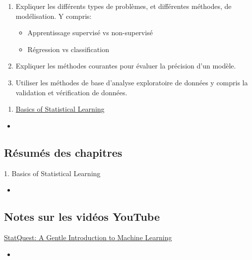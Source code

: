 \documentclass[12pt, titlepage, french]{report}
\begin{document}
\begin{outcomes}
\begin{enumerate}
	\item	Expliquer les différents types de problèmes, et différentes méthodes, de modélisation. Y compris: 
	\begin{itemize}
		\item	Apprentissage supervisé vs non-supervisé
		\item	Régression vs classification	
	\end{itemize}
	\item	Expliquer les méthodes courantes pour évaluer la précision d'un modèle.
	\item	Utiliser les méthodes de base d'analyse exploratoire de données y compris la validation et vérification de données.
\end{enumerate}
\end{outcomes}

\begin{ASM_chapter}
\begin{enumerate}
	\item	\hyperref[BASICS]{Basics of Statistical Learning}
\end{enumerate}
\end{ASM_chapter}

\begin{YTB_vids}
\begin{itemize}
	\item	
\end{itemize}
\end{YTB_vids}

\subsection{Résumés des chapitres}

\begin{CHPT_SUMM}[label = {BASICS}]{1. Basics of Statistical Learning}
	\begin{itemize}
		\item	
	\end{itemize}
\end{CHPT_SUMM}

\subsection{Notes sur les vidéos YouTube}

\begin{YTB_SUMM}[label = {SQ-BASICS-ML-INTRO}]{\href{https://www.youtube.com/watch?v=Gv9_4yMHFhI&list=PLblh5JKOoLUICTaGLRoHQDuF_7q2GfuJF&index=2&t=0s}{StatQuest: A Gentle Introduction to Machine Learning}}
\begin{itemize}
	\item	
\end{itemize}
\end{YTB_SUMM}

\newpage
\end{document}

